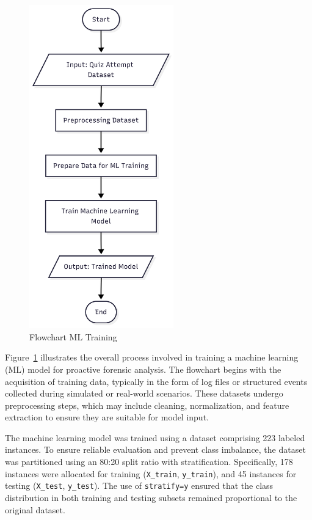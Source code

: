 \begin{figure}[H] 
    \centering
    \includegraphics[height=14cm]{figure/flow-ml-model.png}
    \caption{Flowchart ML Training }
    \label{fig:flow-ml-training}
\end{figure}
Figure~\ref{fig:flow-ml-training} illustrates the overall process involved in training a machine learning (ML) model for proactive forensic analysis. The flowchart begins with the acquisition of training data, typically in the form of log files or structured events collected during simulated or real-world scenarios. These datasets undergo preprocessing steps, which may include cleaning, normalization, and feature extraction to ensure they are suitable for model input.

The machine learning model was trained using a dataset comprising 223 labeled instances. To ensure reliable evaluation and prevent class imbalance, the dataset was partitioned using an 80:20 split ratio with stratification. Specifically, 178 instances were allocated for training (\texttt{X\_train}, \texttt{y\_train}), and 45 instances for testing (\texttt{X\_test}, \texttt{y\_test}). The use of \texttt{stratify=y} ensured that the class distribution in both training and testing subsets remained proportional to the original dataset.



